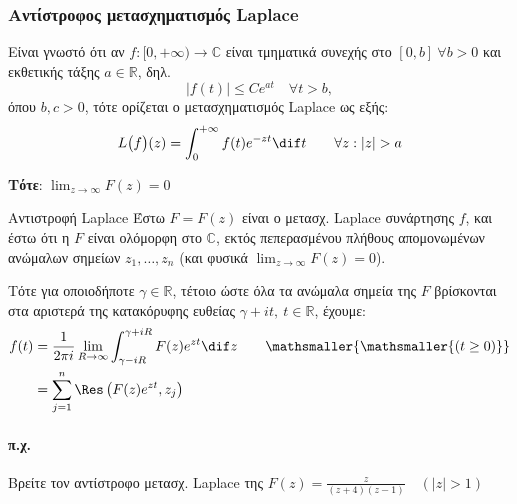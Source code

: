 \documentclass[12pt,a4paper,notitlepage,fleqn]{article}
\begin{document}
    \subsubsection{Αντίστροφος μετασχηματισμός Laplace}
    Είναι γνωστό ότι αν \( f:[0,+\infty) \to \mathbb C \) είναι
    τμηματικά συνεχής στο \( [0,b] \ \forall b>0 \) και εκθετικής
    τάξης \( a \in \mathbb R \), δηλ.
    \[
    \left| f(t) \right| \leq Ce^{at} \quad \forall t>b,
    \]
    όπου \( b,c > 0 \), τότε ορίζεται ο μετασχηματισμός Laplace ως εξής:
    \[
    L\big(f\big)(z) = \int_{0}^{+\infty} f(t) e^{-zt}\dif t
    \qquad \forall z: |z|>a
    \]
    
    \textbf{Τότε}:
     \( \displaystyle \lim_{z\to \infty} F(z) = 0 \)

    \begin{theorem*}{Αντιστροφή Laplace}
    	Έστω \( F = F(z) \) είναι ο μετασχ. Laplace συνάρτησης \( f \), και έστω ότι η
    	\( F \) είναι ολόμορφη στο \( \mathbb C  \), εκτός πεπερασμένου πλήθους απομονωμένων
    	ανώμαλων σημείων \( z_1,\dots,z_n \) (και φυσικά \( \lim_{z\to \infty} F(z) = 0 \)).

    	Τότε για οποιοδήποτε \( \gamma \in \mathbb R \), τέτοιο ώστε όλα τα ανώμαλα σημεία
    	της \( F \) βρίσκονται στα αριστερά της κατακόρυφης ευθείας \( \gamma+it, \ t
    	\in \mathbb R
    	 \), έχουμε:
    	\begin{align*}
    	f(t) &= \frac{1}{2\pi i} \lim_{R\to \infty} \int_{\gamma-iR}^{\gamma+iR}
    	F(z) e^{zt}\dif z \qquad \mathsmaller{\mathsmaller{(t \geq 0)}} \\
    	&= \sum_{j=1}^{n} \Res\left( F(z)e^{zt}, z_j \right)
    	\end{align*}
    \end{theorem*}
    
    \paragraph{π.χ.}
    Βρείτε τον αντίστροφο μετασχ. Laplace της \( \displaystyle F(z)= \frac{z}{(z+4)(z-1)}
    \quad \left(|z|>1\right)
     \)
    
\end{document}
